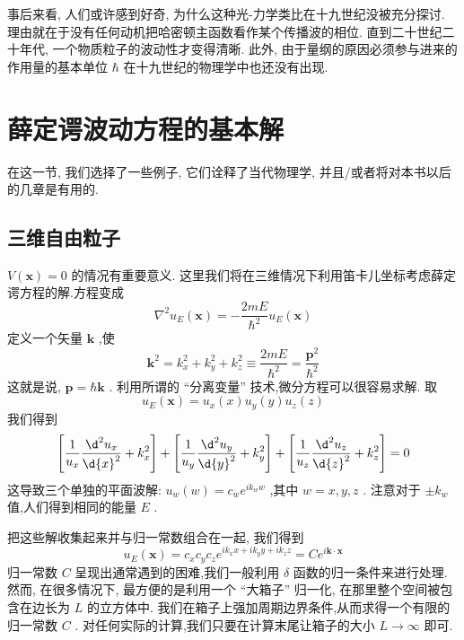 事后来看, 人们或许感到好奇, 为什么这种光-力学类比在十九世纪没被充分探讨. 理由就在于没有任何动机把哈密顿主函数看作某个传播波的相位. 直到二十世纪二十年代, 一个物质粒子的波动性才变得清晰. 此外, 由于量纲的原因必须参与进来的作用量的基本单位 $\hbar$ 在十九世纪的物理学中也还没有出现.
\section{薛定谔波动方程的基本解}
在这一节, 我们选择了一些例子, 它们诠释了当代物理学, 并且/或者将对本书以后的几章是有用的.
\subsection{三维自由粒子}
$V\left( \mathbf{x}\right) = 0$ 的情况有重要意义. 这里我们将在三维情况下利用笛卡儿坐标考虑薛定谔方程的解.方程变成
\begin{equation}
{\nabla }^{2}{u}_{E}\left( \mathbf{x}\right) = - \frac{2mE}{{\hbar }^{2}}{u}_{E}\left( \mathbf{x}\right)
\end{equation}
定义一个矢量 $\mathbf{k}$ ,使
\begin{equation}
{\mathbf{k}}^{2} = {k}_{x}^{2} + {k}_{y}^{2} + {k}_{z}^{2} \equiv \frac{2mE}{{\hbar }^{2}} = \frac{{\mathbf{p}}^{2}}{{\hbar }^{2}}
\end{equation}
这就是说, $\mathbf{p} = \hbar \mathbf{k}$ . 利用所谓的 “分离变量” 技术,微分方程可以很容易求解. 取
\begin{equation}
{u}_{E}\left( \mathbf{x}\right) = {u}_{x}\left( x\right) {u}_{y}\left( y\right) {u}_{z}\left( z\right)
\end{equation}
我们得到
\begin{equation}
\left\lbrack {\frac{1}{{u}_{x}}\frac{{\d}^{2}{u}_{x}}{\d {x}^{2}} + {k}_{x}^{2}}\right\rbrack + \left\lbrack {\frac{1}{{u}_{y}}\frac{{\d}^{2}{u}_{y}}{\d{y}^{2}} + {k}_{y}^{2}}\right\rbrack + \left\lbrack {\frac{1}{{u}_{z}}\frac{{\d}^{2}{u}_{z}}{\d{z}^{2}} + {k}_{z}^{2}}\right\rbrack = 0
\end{equation}
这导致三个单独的平面波解: ${u}_{w}\left( w\right) = {c}_{w}{e}^{i{k}_{w}w}$ ,其中 $w = x, y, z$ . 注意对于 $\pm {k}_{w}$ 值,人们得到相同的能量 $E$ .

把这些解收集起来并与归一常数组合在一起, 我们得到
\begin{equation}
{u}_{E}\left( \mathbf{x}\right) = {c}_{x}{c}_{y}{c}_{z}{e}^{i{k}_{x}x + i{k}_{y}y + i{k}_{z}z} = C{e}^{i\mathbf{k} \cdot \mathbf{x}}
\end{equation}
归一常数 $C$ 呈现出通常遇到的困难,我们一般利用 $\delta$ 函数的归一条件来进行处理. 然而, 在很多情况下, 最方便的是利用一个 “大箱子” 归一化, 在那里整个空间被包含在边长为 $L$ 的立方体中. 我们在箱子上强加周期边界条件,从而求得一个有限的归一常数 $C$ . 对任何实际的计算,我们只要在计算末尾让箱子的大小 $L \rightarrow \infty$ 即可.

